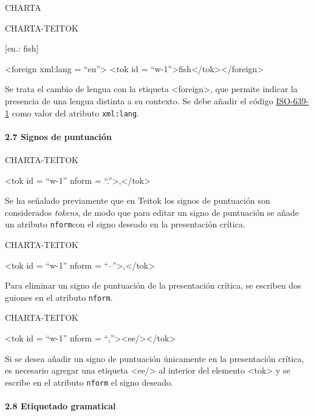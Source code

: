 \documentclass[
]{book}
\begin{document}
CHARTA

CHARTA-TEITOK

{[}en.: fish{]}

{\textless foreign} {xml:lang} {=} {``en''}{\textgreater{}} {\textless tok} {id} {=} {``w-1''}{\textgreater{}}fish{\textless/tok\textgreater{}}{\textless/foreign\textgreater{}}

Se trata el cambio de lengua con la etiqueta { \textless foreign\textgreater{}}, que permite indicar la presencia de una lengua distinta a su contexto. Se debe añadir el código \href{https://fr.wikipedia.org/wiki/Liste_des_codes_ISO_639-1}{ISO-639-1} como valor del atributo \texttt{xml:lang}.

\hypertarget{signos-de-puntuaciuxf3n}{%
\paragraph*{2.7 Signos de puntuación}\label{signos-de-puntuaciuxf3n}}

CHARTA-TEITOK

{\textless tok} {id} {=} {``w-1''} {nform} {=} {``.''}{\textgreater{}},{\textless/tok\textgreater{}}

Se ha señalado previamente que en Teitok los signos de puntuación son considerados \emph{tokens}, de modo que para editar un signo de puntuación se añade un atributo \texttt{nform}con el signo deseado en la presentación crítica.

CHARTA-TEITOK

{\textless tok} {id} {=} {``w-1''} {nform} {=} {``--''}{\textgreater{}},{\textless/tok\textgreater{}}

Para eliminar un signo de puntuación de la presentación crítica, se escriben dos guiones en el atributo \texttt{nform}.

CHARTA-TEITOK

{\textless tok} {id} {=} {``w-1''} {nform} {=} {``,''}{\textgreater{}}{\textless ee/\textgreater\textless/tok\textgreater{}}

Si se desea añadir un signo de puntuación únicamente en la presentación crítica, es necesario agregar una etiqueta { \textless ee/\textgreater{}} al interior del elemento { \textless tok\textgreater{}} y se escribe en el atributo \texttt{nform} el signo deseado.

\hypertarget{etiquetado-gramatical}{%
\paragraph*{2.8 Etiquetado gramatical}\label{etiquetado-gramatical}}
\end{document}
